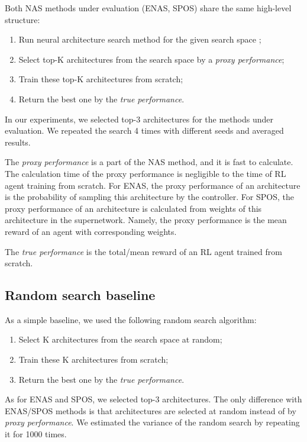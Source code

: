 \documentclass{svproc}
\begin{document}
Both NAS methods under evaluation (ENAS, SPOS) share the same high-level structure: 
\begin{enumerate}
\item Run neural architecture search method for the given search space ;
\item Select top-K architectures from the search space  by a \textit{proxy performance};
\item Train these top-K architectures from scratch;
\item Return the best one by the \textit{true performance}. \end{enumerate}

In our experiments, we selected top-3 architectures for the methods under evaluation. We repeated the search 4 times with different seeds and averaged results.

The \textit{proxy performance} is a part of the NAS method, and it is fast to calculate. The calculation time of the proxy performance is negligible to the time of RL agent training from scratch. For ENAS, the proxy performance of an architecture is the probability of sampling this architecture by the controller. For SPOS, the proxy performance of an architecture is calculated from weights of this architecture in the supernetwork. Namely, the proxy performance is the mean reward of an agent with corresponding weights. 

The \textit{true performance} is the total/mean reward of an RL agent trained from scratch. 









\subsection{Random search baseline} 
As a simple baseline, we used the following random search algorithm:
\begin{enumerate}
\item Select K architectures from the search space  at random;
\item Train these K architectures from scratch;
\item Return the best one by the \textit{true performance}.
\end{enumerate}

As for ENAS and SPOS, we selected top-3 architectures.
The only difference with ENAS/SPOS methods is that architectures are selected at random instead of by \textit{proxy performance}.
We estimated the variance of the random search by repeating it for 1000 times.
\end{document}
